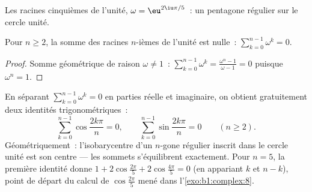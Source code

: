 \begin{omfigure}

{\small Les racines cinquièmes de l'unité, $\omega =
\eu^{2\iu\pi/5}$~: un pentagone régulier sur le cercle unité.}
\end{omfigure}

\begin{proposition}\label{prop:b1:complex:sumroots}
Pour $n \geq 2$, la somme des racines $n$-ièmes de l'unité est nulle~:
$\sum_{k=0}^{n-1} \omega^k = 0$.
\end{proposition}

\begin{proof}
Somme géométrique de raison $\omega \neq 1$~:
$\sum_{k=0}^{n-1} \omega^k = \frac{\omega^n - 1}{\omega - 1} = 0$
puisque $\omega^n = 1$.
\end{proof}

\begin{example}\label{ex:b1:complex:sumrootsparts}
En séparant $\sum_{k=0}^{n-1}\omega^k = 0$ en parties réelle et
imaginaire, on obtient gratuitement deux identités
trigonométriques~:
\[
\sum_{k=0}^{n-1}\cos\frac{2k\pi}n = 0,
\qquad
\sum_{k=0}^{n-1}\sin\frac{2k\pi}n = 0
\qquad (n \geq 2).
\]
Géométriquement~: l'isobarycentre d'un $n$-gone régulier inscrit
dans le cercle unité est son centre --- les sommets s'équilibrent
exactement. Pour $n = 5$, la première identité donne $1 +
2\cos\frac{2\pi}5 + 2\cos\frac{4\pi}5 = 0$ (en appariant $k$ et $n
- k$), point de départ du calcul de $\cos\frac{2\pi}5$ mené dans
l'\cref{exo:b1:complex:8}.
\end{example}

